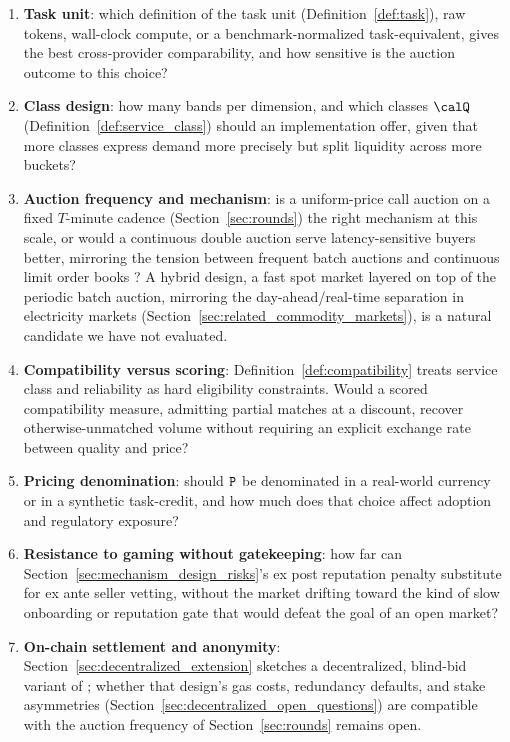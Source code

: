 \begin{enumerate}
  \item \textbf{Task unit}: which definition of the task unit
    (Definition~\ref{def:task}), raw tokens, wall-clock compute, or a
    benchmark-normalized task-equivalent, gives the best cross-provider
    comparability, and how sensitive is the auction outcome to this
    choice?

  \item \textbf{Class design}: how many bands per dimension, and which
    classes $\calQ$ (Definition~\ref{def:service_class}) should an
    implementation offer, given that more classes express demand more
    precisely but split liquidity across more buckets?

  \item \textbf{Auction frequency and mechanism}: is a uniform-price call
    auction on a fixed $T$-minute cadence
    (Section~\ref{sec:rounds}) the right mechanism at this scale, or would
    a continuous double auction serve latency-sensitive buyers better,
    mirroring the tension between frequent batch auctions and continuous
    limit order books \cite{budish2015}? A hybrid design, a fast spot
    market layered on top of the periodic batch auction, mirroring the
    day-ahead/real-time separation in electricity markets
    (Section~\ref{sec:related_commodity_markets}), is a natural candidate
    we have not evaluated.

  \item \textbf{Compatibility versus scoring}: Definition~\ref{def:compatibility}
    treats service class and reliability as hard eligibility constraints. Would
    a scored compatibility measure, admitting partial matches at a
    discount, recover otherwise-unmatched volume without requiring an
    explicit exchange rate between quality and price?

  \item \textbf{Pricing denomination}: should $\textnormal{\texttt{P}}$ be denominated
    in a real-world currency or in a synthetic task-credit, and how much
    does that choice affect adoption and regulatory exposure?

  \item \textbf{Resistance to gaming without gatekeeping}: how far can
    Section~\ref{sec:mechanism_design_risks}'s ex post reputation penalty
    substitute for ex ante seller vetting, without the market drifting
    toward the kind of slow onboarding or reputation gate that would
    defeat the goal of an open market?

  \item \textbf{On-chain settlement and anonymity}: Section~\ref{sec:decentralized_extension}
    sketches a decentralized, blind-bid variant of \NoesisMarket; whether
    that design's gas costs, redundancy defaults, and stake asymmetries
    (Section~\ref{sec:decentralized_open_questions}) are compatible with
    the auction frequency of Section~\ref{sec:rounds} remains open.
\end{enumerate}

